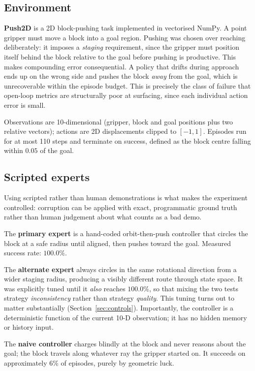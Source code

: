 \documentclass[10pt,twocolumn]{article}
\begin{document}
\subsection{Environment}

\textbf{Push2D} is a 2D block-pushing task implemented in vectorised NumPy. A
point gripper must move a block into a goal region. Pushing was chosen over
reaching deliberately: it imposes a \emph{staging} requirement, since the
gripper must position itself behind the block relative to the goal before
pushing is productive. This makes compounding error consequential. A policy
that drifts during approach ends up on the wrong side and pushes the block
\emph{away} from the goal, which is unrecoverable within the episode budget.
This is precisely the class of failure that open-loop metrics are structurally
poor at surfacing, since each individual action error is small.

Observations are 10-dimensional (gripper, block and goal positions plus two
relative vectors); actions are 2D displacements clipped to $[-1,1]$. Episodes
run for at most 110 steps and terminate on success, defined as the block
centre falling within $0.05$ of the goal.

\subsection{Scripted experts}

Using scripted rather than human demonstrations is what makes the experiment
controlled: corruption can be applied with exact, programmatic ground truth
rather than human judgement about what counts as a bad demo.

The \textbf{primary expert} is a hand-coded orbit-then-push controller that
circles the block at a safe radius until aligned, then pushes toward the goal.
Measured success rate: $\mathbf{100.0\%}$.

The \textbf{alternate expert} always circles in the same rotational direction
from a wider staging radius, producing a visibly different route through state
space. It was explicitly tuned until it \emph{also} reaches
$\mathbf{100.0\%}$, so that mixing the two tests strategy \emph{inconsistency}
rather than strategy \emph{quality}. This tuning turns out to matter
substantially (Section~\ref{sec:controls}). Importantly, the controller is a
deterministic function of the current 10-D observation; it has no hidden
memory or history input.

The \textbf{naive controller} charges blindly at the block and never reasons
about the goal; the block travels along whatever ray the gripper started on.
It succeeds on approximately 6\% of episodes, purely by geometric luck.
\end{document}
